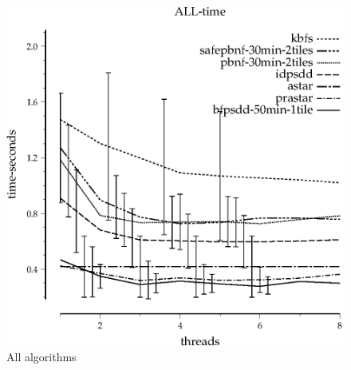\documentclass{article}
\begin{document}
\begin{figure}
\begin{center}
\includegraphics{ALL-time}
\end{center}
\caption{All algorithms}
\end{figure}
\end{document}
